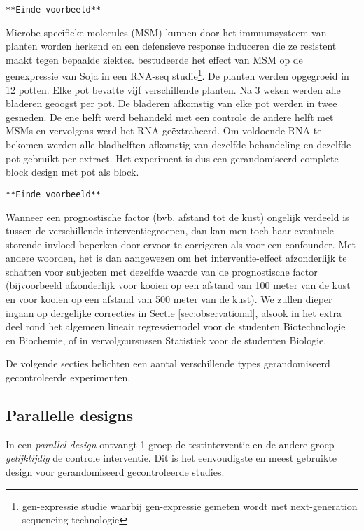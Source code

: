 \documentclass[12pt,dutch,coursenotes]{book}
\let\rmarkdownfootnote\footnote%
\def\footnote{\protect\rmarkdownfootnote}
\theoremstyle{definition}
\theoremstyle{definition}
\theoremstyle{definition}
\theoremstyle{remark}
\let\BeginKnitrBlock\begin \let\EndKnitrBlock\end
\begin{document}
\texttt{**Einde\ voorbeeld**}

\BeginKnitrBlock{example}[Effect van bladschade]
\protect\hypertarget{exm:unnamed-chunk-20}{}{\label{exm:unnamed-chunk-20}
\iffalse (Effect van bladschade) \fi{} }
\EndKnitrBlock{example} Microbe-specifieke molecules (MSM) kunnen door
het immuunsysteem van planten worden herkend en een defensieve response
induceren die ze resistent maakt tegen bepaalde ziektes.
\citet{Valdes2014} bestudeerde het effect van MSM op de genexpressie van
Soja in een RNA-seq studie\footnote{gen-expressie studie waarbij
  gen-expressie gemeten wordt met next-generation sequencing technologie}.
De planten werden opgegroeid in 12 potten. Elke pot bevatte vijf
verschillende planten. Na 3 weken werden alle bladeren geoogst per pot.
De bladeren afkomstig van elke pot werden in twee gesneden. De ene helft
werd behandeld met een controle de andere helft met MSMs en vervolgens
werd het RNA geëxtraheerd. Om voldoende RNA te bekomen werden alle
bladhelften afkomstig van dezelfde behandeling en dezelfde pot gebruikt
per extract. Het experiment is dus een gerandomiseerd complete block
design met pot als block.

\texttt{**Einde\ voorbeeld**}

Wanneer een prognostische factor (bvb. afstand tot de kust) ongelijk
verdeeld is tussen de verschillende interventiegroepen, dan kan men toch
haar eventuele storende invloed beperken door ervoor te corrigeren als
voor een confounder. Met andere woorden, het is dan aangewezen om het
interventie-effect afzonderlijk te schatten voor subjecten met dezelfde
waarde van de prognostische factor (bijvoorbeeld afzonderlijk voor
kooien op een afstand van 100 meter van de kust en voor kooien op een
afstand van 500 meter van de kust). We zullen dieper ingaan op
dergelijke correcties in Sectie \ref{sec:observational}, alsook in het
extra deel rond het algemeen lineair regressiemodel voor de studenten
Biotechnologie en Biochemie, of in vervolgcursussen Statistiek voor de
studenten Biologie.

De volgende secties belichten een aantal verschillende types
gerandomiseerd gecontroleerde experimenten.

\subsection{Parallelle designs}\label{parallelle-designs}

In een \emph{parallel design} ontvangt 1 groep de testinterventie en de
andere groep \emph{gelijktijdig} de controle interventie. Dit is het
eenvoudigste en meest gebruikte design voor gerandomiseerd
gecontroleerde studies.
\end{document}
